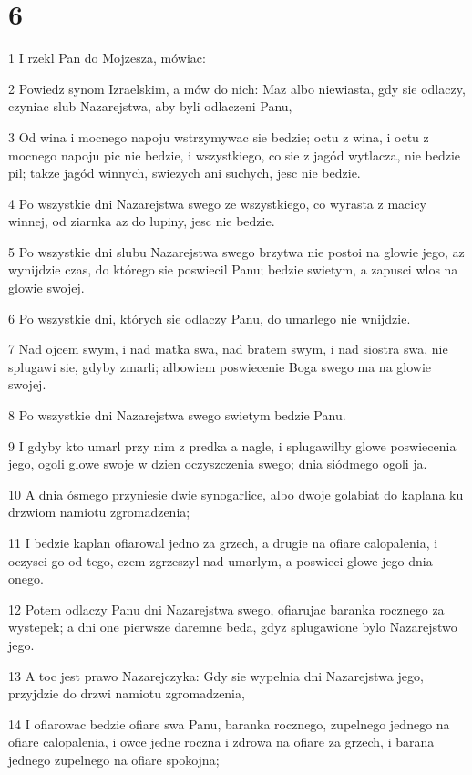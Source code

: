 \chapter{6}

\par 1 I rzekl Pan do Mojzesza, mówiac:
\par 2 Powiedz synom Izraelskim, a mów do nich: Maz albo niewiasta, gdy sie odlaczy, czyniac slub Nazarejstwa, aby byli odlaczeni Panu,
\par 3 Od wina i mocnego napoju wstrzymywac sie bedzie; octu z wina, i octu z mocnego napoju pic nie bedzie, i wszystkiego, co sie z jagód wytlacza, nie bedzie pil; takze jagód winnych, swiezych ani suchych, jesc nie bedzie.
\par 4 Po wszystkie dni Nazarejstwa swego ze wszystkiego, co wyrasta z macicy winnej, od ziarnka az do lupiny, jesc nie bedzie.
\par 5 Po wszystkie dni slubu Nazarejstwa swego brzytwa nie postoi na glowie jego, az wynijdzie czas, do którego sie poswiecil Panu; bedzie swietym, a zapusci wlos na glowie swojej.
\par 6 Po wszystkie dni, których sie odlaczy Panu, do umarlego nie wnijdzie.
\par 7 Nad ojcem swym, i nad matka swa, nad bratem swym, i nad siostra swa, nie splugawi sie, gdyby zmarli; albowiem poswiecenie Boga swego ma na glowie swojej.
\par 8 Po wszystkie dni Nazarejstwa swego swietym bedzie Panu.
\par 9 I gdyby kto umarl przy nim z predka a nagle, i splugawilby glowe poswiecenia jego, ogoli glowe swoje w dzien oczyszczenia swego; dnia siódmego ogoli ja.
\par 10 A dnia ósmego przyniesie dwie synogarlice, albo dwoje golabiat do kaplana ku drzwiom namiotu zgromadzenia;
\par 11 I bedzie kaplan ofiarowal jedno za grzech, a drugie na ofiare calopalenia, i oczysci go od tego, czem zgrzeszyl nad umarlym, a poswieci glowe jego dnia onego.
\par 12 Potem odlaczy Panu dni Nazarejstwa swego, ofiarujac baranka rocznego za wystepek; a dni one pierwsze daremne beda, gdyz splugawione bylo Nazarejstwo jego.
\par 13 A toc jest prawo Nazarejczyka: Gdy sie wypelnia dni Nazarejstwa jego, przyjdzie do drzwi namiotu zgromadzenia,
\par 14 I ofiarowac bedzie ofiare swa Panu, baranka rocznego, zupelnego jednego na ofiare calopalenia, i owce jedne roczna i zdrowa na ofiare za grzech, i barana jednego zupelnego na ofiare spokojna;
